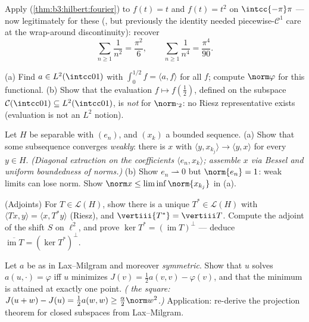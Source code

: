 \begin{exercise}[$\star\star$]\label{exo:b3:hilbert:5}
Apply  (\cref{thm:b3:hilbert:fourier}) to $f(t) = t$
and $f(t) = t^2$ on $\intcc{-\pi}\pi$ --- now legitimately for
these (, but previously the identity needed
piecewise-$\mathcal C^1$ care at the wrap-around
discontinuity): recover
\[
\sum_{n\geq1}\frac1{n^2} = \frac{\pi^2}6,
\qquad
\sum_{n\geq1}\frac1{n^4} = \frac{\pi^4}{90} .
\]
\end{exercise}

\begin{exercise}[$\star\star$]\label{exo:b3:hilbert:6}
(a) Find $a \in L^2(\intcc01)$ with $\int_0^{1/2}f =
\langle a, f\rangle$ for all $f$; compute $\norm\varphi$ for
this functional.
(b) Show that the evaluation $f \mapsto f(\frac12)$, defined
on the subspace $\mathcal C(\intcc01) \subseteq
L^2(\intcc01)$, is \emph{not}  for
$\norm\cdot_2$: no Riesz representative exists (evaluation is
not an $L^2$ notion).
\end{exercise}

\begin{exercise}[$\star\star\star$]\label{exo:b3:hilbert:7}
Let $H$ be separable with  $(e_n)$, and $(x_k)$ a
bounded sequence.
(a) Show that some subsequence converges \emph{weakly}: there
is $x$ with $\langle y, x_{k_j}\rangle \to \langle y,
x\rangle$ for every $y \in H$. \emph{(Diagonal extraction on
the coefficients $\langle e_n, x_k\rangle$; assemble $x$ via
Bessel and uniform boundedness of norms.)}
(b) Show $e_n \rightharpoonup 0$ but $\norm{e_n} = 1$: weak
limits can lose norm. Show $\norm x \leq
\liminf\norm{x_{k_j}}$ in (a).
\end{exercise}

\begin{exercise}[$\star\star$]\label{exo:b3:hilbert:8}
(Adjoints) For $T \in \mathcal L(H)$, show there is a unique
$T^* \in \mathcal L(H)$ with $\langle Tx, y\rangle = \langle
x, T^*y\rangle$ (Riesz), and $\vertiii{T^*} = \vertiii T$.
Compute the adjoint of the shift $S$ on $\ell^2$, and prove
$\ker T^* = (\operatorname{im}T)^\perp$ --- deduce
$\overline{\operatorname{im}T} = (\ker T^*)^\perp$.
\end{exercise}

\begin{exercise}[$\star\star$]\label{exo:b3:hilbert:9}
Let $a$ be as in Lax--Milgram and moreover \emph{symmetric}.
Show that $u$ solves $a(u, \cdot) = \varphi$ iff $u$ minimizes
$J(v) = \frac12a(v, v) - \varphi(v)$, and that the minimum is
attained at exactly one point. \emph{( the square:
$J(u + w) - J(u) = \frac12a(w,w) \geq
\frac\alpha2\norm w^2$.)} Application: re-derive the
projection theorem for closed subspaces from Lax--Milgram.
\end{exercise}

